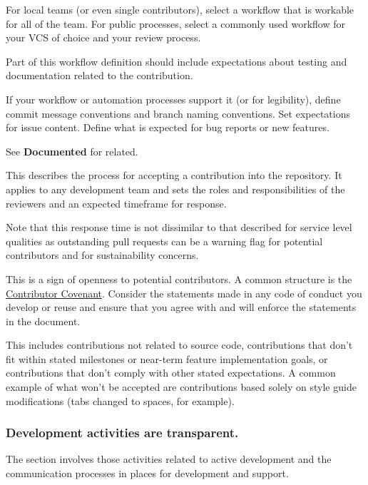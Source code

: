 \documentclass{article}
\newcounter{subsubsubsection}[subsubsection]
\begin{document}
For local teams (or even single contributors), select a workflow that is workable for all of the team. For public processes, select a commonly used workflow for your VCS of choice and your review process.
 
Part of this workflow definition should include expectations about testing and documentation related to the contribution. 

If your workflow or automation processes support it (or for legibility), define commit message conventions and branch naming conventions. Set expectations for issue content. Define what is expected for bug reports or new features. 
 
See \textbf{Documented} for related.

This describes the process for accepting a contribution into the repository. It applies to any development team and sets the roles and responsibilities of the reviewers and an expected timeframe for response.
 
Note that this response time is not dissimilar to that described for service level qualities as outstanding pull requests can be a warning flag for potential contributors and for sustainability concerns.

This is a sign of openness to potential contributors. A common structure is the \href{http://contributor-covenant.org/} {Contributor Covenant}. Consider the statements made in any code of conduct you develop or reuse and ensure that you agree with and will enforce the statements in the document. 

This includes contributions not related to source code, contributions that don’t fit within stated milestones or near-term feature implementation goals, or contributions that don’t comply with other stated expectations. A common example of what won’t be accepted are contributions based solely on style guide modifications (tabs changed to spaces, for example). 

\subsubsection{Development activities are transparent.}
The section involves those activities related to active development and the communication processes in places for development and support.
\end{document}
